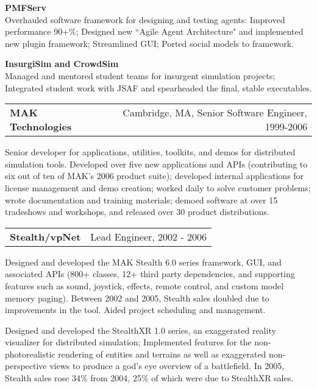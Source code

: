 {\bf PMFServ}\\
Overhauled software framework for designing and testing agents: Improved performance 90+\%; Designed new ``Agile Agent Architecture" and implemented new plugin framework; Streamlined GUI; Ported social models to framework.

{\bf InsurgiSim and CrowdSim}\\
Managed and mentored student teams for insurgent simulation projects; Integrated student work with JSAF and spearheaded the final, stable executables. 

\medskip
\medskip

\needspace{6em}
\begin{tabular*}{7.1in}{@{}l@{\extracolsep\fill}r}
{\large {\bf MAK Technologies}} & Cambridge, MA, Senior Software Engineer, 1999-2006\\
\end{tabular*}

Senior developer for applications, utilities, toolkits, and demos for distributed simulation tools.  Developed over five new applications and APIs (contributing to six out of ten of MAK's 2006 product suite); developed internal applications for license management and demo creation; worked daily to solve customer problems; wrote documentation and training materials; demoed software at over 15 tradeshows and workshops, and released over 30 product distributions. 

\medskip
\needspace{6em}
\begin{tabular*}{7.1in}{@{}l@{\extracolsep\fill}r}
{\bf Stealth/vpNet} & Lead Engineer, 2002 - 2006\\
\end{tabular*}
Designed and developed the MAK Stealth 6.0 series framework, GUI, and associated APIs (800+ classes, 12+ third party dependencies, and supporting features such as sound, joystick, effects, remote control, and custom model memory paging).  Between 2002 and 2005, Stealth sales doubled due to improvements in the tool. Aided project scheduling and management.

Designed and developed the StealthXR 1.0 series, an exaggerated reality visualizer for distributed simulation; Implemented features for the non-photorealistic rendering of entities and terrains as well as exaggerated non-perspective views to produce a god's eye overview of a battlefield.  In 2005, Stealth sales rose 34\% from 2004, 25\% of which were due to StealthXR sales. 

